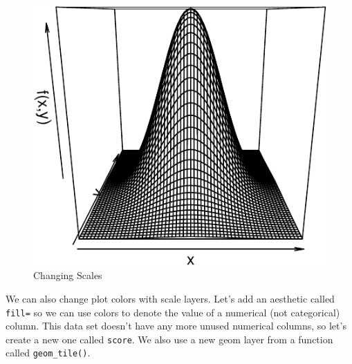 \documentclass[
  12pt,
  krantz2]{krantz}
\makeatletter
\newenvironment{Shaded}{\begin{snugshade}}{\end{snugshade}}
\newcommand{\AttributeTok}[1]{\textcolor[rgb]{0.61,0.61,0.61}{#1}}
\newcommand{\DecValTok}[1]{\textcolor[rgb]{0.06,0.06,0.06}{#1}}
\newcommand{\FunctionTok}[1]{\textcolor[rgb]{0,0,0}{#1}}
\newcommand{\NormalTok}[1]{#1}
\newcommand{\OtherTok}[1]{\textcolor[rgb]{0.37,0.37,0.37}{#1}}
\newcommand{\SpecialCharTok}[1]{\textcolor[rgb]{0,0,0}{#1}}
\newenvironment{kframe}{%
\medskip{}
\setlength{\fboxsep}{.8em}
 \def\at@end@of@kframe{}%
 \ifinner\ifhmode%
  \def\at@end@of@kframe{\end{minipage}}%
  \begin{minipage}{\columnwidth}%
 \fi\fi%
 \def\FrameCommand##1{\hskip\@totalleftmargin \hskip-\fboxsep
 \colorbox{shadecolor}{##1}\hskip-\fboxsep
     \hskip-\linewidth \hskip-\@totalleftmargin \hskip\columnwidth}%
 \MakeFramed {\advance\hsize-\width
   \@totalleftmargin\z@ \linewidth\hsize
   \@setminipage}}%
 {\par\unskip\endMakeFramed%
 \at@end@of@kframe}
\renewenvironment{Shaded}{\begin{kframe}}{\end{kframe}}
\makeatother
\begin{document}
\begin{figure}

{\centering \includegraphics[width=0.8\linewidth]{r_and_python_book_files/figure-latex/unnamed-chunk-223-1} 

}

\caption{Changing Scales}\label{fig:unnamed-chunk-223}
\end{figure}

We can also change plot colors with scale layers. Let's add an aesthetic called \texttt{fill=} so we can use colors to denote the value of a numerical (not categorical) column. This data set doesn't have any more unused numerical columns, so let's create a new one called \texttt{score}. We also use a new geom layer from a function called \texttt{geom\_tile()}.

\begin{Shaded}
\end{Shaded}
\end{document}
